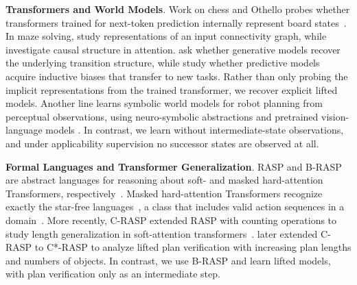 
\noindent \textbf{Transformers and World Models}.
Work on chess and Othello probes whether transformers trained for next-token prediction internally represent board states~\citep{Toshniwal_Wiseman_Livescu_Gimpel_2022,li_iclr,nanda2023linear}.
In maze solving, \citet{spies2025transformers} study representations of an input connectivity graph, while \citet{rohekar2025a} investigate causal structure in attention. 
\citet{world-models2} ask whether generative models recover the underlying transition structure, while \citet{vafa2025what} study whether predictive models acquire inductive biases that transfer to new tasks.
Rather than only probing the implicit representations 
from the trained transformer, we recover explicit lifted \strips models. 
Another line learns symbolic world models for robot planning from perceptual observations, using neuro-symbolic abstractions and pretrained vision-language models
\citep{liang2025visualpredicator,liang2026exopredicator,athalye2026pixels}.
In contrast, we learn without intermediate-state observations, and under applicability supervision no successor states are observed at all. 

\noindent \textbf{Formal Languages and Transformer Generalization}.
RASP and B-RASP are abstract languages for reasoning about soft- and masked hard-attention Transformers, respectively~\citep{rasp,yang2024masked}.
Masked hard-attention Transformers recognize exactly the star-free languages~\citep{yang2024masked}, a class that includes valid action sequences in a \strips domain~\citep{Lin_Bercher_2022}. 
More recently, C-RASP extended RASP with counting operations to study length generalization in soft-attention transformers~\citep{yang2024counting,huang2025length}.
\citet{sarrof2026verify} later extended C-RASP to C*-RASP to analyze lifted \strips plan verification with increasing plan lengths and numbers of objects.
In contrast, we use B-RASP and learn lifted \strips models, with plan verification only as an intermediate step.


